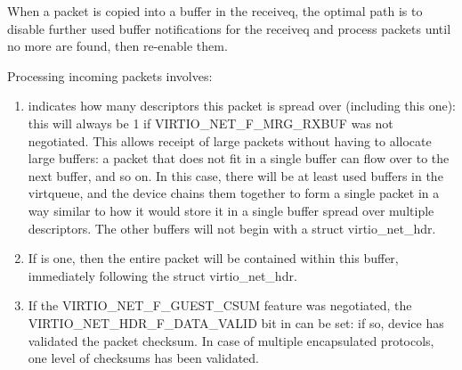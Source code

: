 When a packet is copied into a buffer in the receiveq, the
optimal path is to disable further used buffer notifications for the
receiveq and process packets until no more are found, then re-enable
them.

Processing incoming packets involves:

\begin{enumerate}
\item {} indicates how many descriptors
  this packet is spread over (including this one): this will
  always be 1 if VIRTIO_NET_F_MRG_RXBUF was not negotiated.
  This allows receipt of large packets without having to allocate large
  buffers: a packet that does not fit in a single buffer can flow
  over to the next buffer, and so on. In this case, there will be
  at least  used buffers in the virtqueue, and the device
  chains them together to form a single packet in a way similar to
  how it would store it in a single buffer spread over multiple
  descriptors.
  The other buffers will not begin with a struct virtio_net_hdr.

\item If
   is one, then the entire packet will be
  contained within this buffer, immediately following the struct
  virtio_net_hdr.
\item If the VIRTIO_NET_F_GUEST_CSUM feature was negotiated, the
  VIRTIO_NET_HDR_F_DATA_VALID bit in  can be
  set: if so, device has validated the packet checksum.
  In case of multiple encapsulated protocols, one level of checksums
  has been validated.
\end{enumerate}

